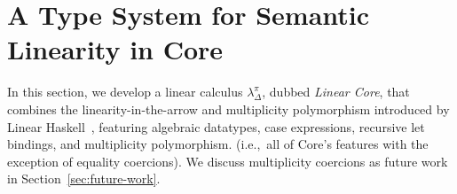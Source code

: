 \documentclass[acmsmall,review,anonymous]{acmart}
\begin{document}
  

\section{A Type System for Semantic Linearity in Core\label{sec:main:linear-core}}

In this section, we develop a linear calculus $\lambda_\Delta^\pi$,
dubbed \emph{Linear Core}, that combines the linearity-in-the-arrow
and multiplicity polymorphism introduced by Linear
Haskell~\cite{cite:linearhaskell}, featuring algebraic datatypes, case
expressions, recursive let bindings, and multiplicity polymorphism.
(i.e.,~all of Core's features with the exception of equality
coercions).  We discuss multiplicity coercions as future work in
Section~\ref{sec:future-work}.
%
\end{document}

